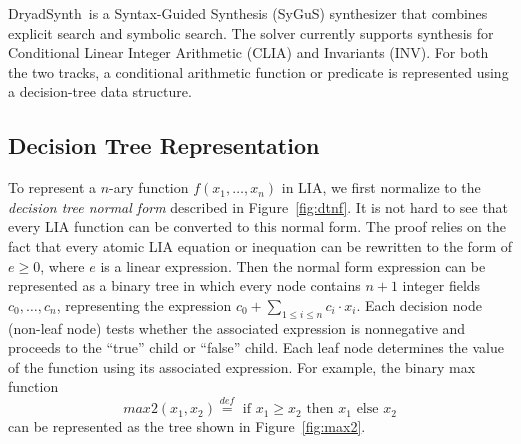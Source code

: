 \documentclass[conference]{IEEEtran}
\newcommand{\DryadSynth}{{\sc DryadSynth~}}
\begin{document}




\maketitle

\begin{abstract}
this paper presents \DryadSynth, a concolic SyGuS solver. The synthesis algorithm is CEGIS-based and combines enumerative search and symbolic search.
\end{abstract}





%
\IEEEpeerreviewmaketitle

\DryadSynth is a Syntax-Guided Synthesis (SyGuS) synthesizer that combines explicit search and symbolic search. The solver currently supports synthesis for Conditional Linear Integer Arithmetic (CLIA) and Invariants (INV). For both the two tracks, a conditional arithmetic function or predicate is represented using a decision-tree data structure.

\subsection*{Decision Tree Representation}

To represent a $n$-ary function $f(x_1, \dots, x_n)$ in LIA, we first normalize to the \emph{decision tree normal form} described in Figure~\ref{fig:dtnf}. It is not hard to see that every LIA function can be converted to this normal form. The proof relies on the fact that every atomic LIA equation or inequation can be rewritten to the form of $e \geq 0$, where $e$ is a linear expression. Then the normal form expression can be represented as a binary tree in which every node contains $n+1$ integer fields $c_0, \dots, c_n$, representing the expression $c_0 + \sum_{1 \leq i \leq n}  c_i \cdot x_i$. Each decision node (non-leaf node) tests whether the associated expression is nonnegative and proceeds to the ``true'' child or ``false'' child. Each leaf node determines the value of the function using its associated expression. For example, the binary max function $$max2(x_1, x_2) \stackrel{\textit{def}}{=} \textrm{~if~} x_1 \geq x_2 \textrm{~then~} x_1 \textrm{~else~} x_2$$ can be represented as the tree shown in Figure~\ref{fig:max2}.
\end{document}
